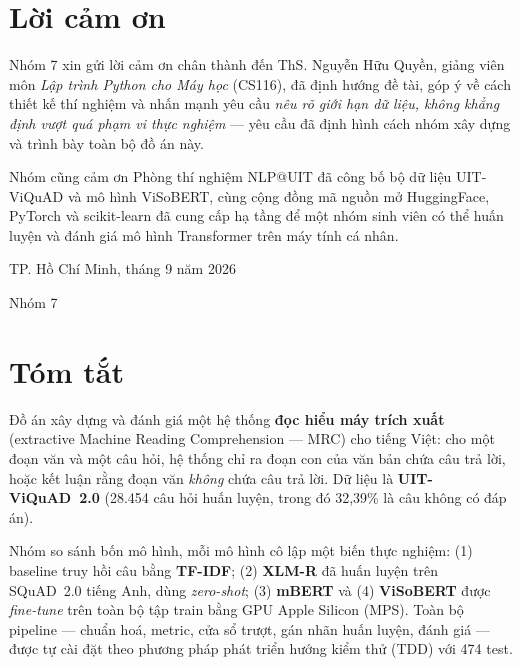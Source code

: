 
\section*{Lời cảm ơn}

Nhóm 7 xin gửi lời cảm ơn chân thành đến ThS. Nguyễn Hữu Quyền, giảng viên môn
\emph{Lập trình Python cho Máy học} (CS116), đã định hướng đề tài, góp ý về cách
thiết kế thí nghiệm và nhấn mạnh yêu cầu \emph{nêu rõ giới hạn dữ liệu, không khẳng
định vượt quá phạm vi thực nghiệm} --- yêu cầu đã định hình cách nhóm xây dựng và
trình bày toàn bộ đồ án này.

Nhóm cũng cảm ơn Phòng thí nghiệm NLP@UIT đã công bố bộ dữ liệu UIT-ViQuAD và mô hình
ViSoBERT, cùng cộng đồng mã nguồn mở HuggingFace, PyTorch và scikit-learn đã cung cấp
hạ tầng để một nhóm sinh viên có thể huấn luyện và đánh giá mô hình Transformer trên
máy tính cá nhân.

\vspace{1em}
\hfill TP. Hồ Chí Minh, tháng 9 năm 2026

\hfill Nhóm 7

\clearpage
\section*{Tóm tắt}

Đồ án xây dựng và đánh giá một hệ thống \textbf{đọc hiểu máy trích xuất} (extractive
Machine Reading Comprehension --- MRC) cho tiếng Việt: cho một đoạn văn và một câu hỏi,
hệ thống chỉ ra đoạn con của văn bản chứa câu trả lời, hoặc kết luận rằng đoạn văn
\emph{không} chứa câu trả lời. Dữ liệu là \textbf{UIT-ViQuAD~2.0} (28.454 câu hỏi huấn
luyện, trong đó 32,39\% là câu không có đáp án).

Nhóm so sánh bốn mô hình, mỗi mô hình cô lập một biến thực nghiệm: (1) baseline truy
hồi câu bằng \textbf{TF-IDF}; (2) \textbf{XLM-R} đã huấn luyện trên SQuAD~2.0 tiếng
Anh, dùng \emph{zero-shot}; (3) \textbf{mBERT} và (4) \textbf{ViSoBERT} được
\emph{fine-tune} trên toàn bộ tập train bằng GPU Apple Silicon (MPS). Toàn bộ pipeline
--- chuẩn hoá, metric, cửa sổ trượt, gán nhãn huấn luyện, đánh giá --- được tự cài
đặt theo phương pháp phát triển hướng kiểm thử (TDD) với 474 test.

